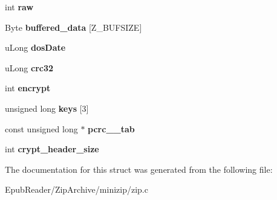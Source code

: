 \begin{DoxyCompactItemize}
\item 
\hypertarget{structcurfile__info_ab79a678fff8d4fb6e55f410d33a5d555}{int {\bfseries raw}}\label{structcurfile__info_ab79a678fff8d4fb6e55f410d33a5d555}

\item 
\hypertarget{structcurfile__info_a73ba705398941ee5d8f0cfc61df6b82d}{Byte {\bfseries buffered\-\_\-data} \mbox{[}Z\-\_\-\-B\-U\-F\-S\-I\-Z\-E\mbox{]}}\label{structcurfile__info_a73ba705398941ee5d8f0cfc61df6b82d}

\item 
\hypertarget{structcurfile__info_afb63cc461b5237c76e41904ed9fb726a}{u\-Long {\bfseries dos\-Date}}\label{structcurfile__info_afb63cc461b5237c76e41904ed9fb726a}

\item 
\hypertarget{structcurfile__info_ab58f6860a40fdaf0932d659d8743f876}{u\-Long {\bfseries crc32}}\label{structcurfile__info_ab58f6860a40fdaf0932d659d8743f876}

\item 
\hypertarget{structcurfile__info_a5bc94d3a94e6ffe7f4e4783c668a263e}{int {\bfseries encrypt}}\label{structcurfile__info_a5bc94d3a94e6ffe7f4e4783c668a263e}

\item 
\hypertarget{structcurfile__info_ac6836b3fb49829e3490cae1e8e319ed6}{unsigned long {\bfseries keys} \mbox{[}3\mbox{]}}\label{structcurfile__info_ac6836b3fb49829e3490cae1e8e319ed6}

\item 
\hypertarget{structcurfile__info_a9de6dd632a0a1eaad2729ae1f993fa71}{const unsigned long $\ast$ {\bfseries pcrc\-\_\-\_\-tab}}\label{structcurfile__info_a9de6dd632a0a1eaad2729ae1f993fa71}

\item 
\hypertarget{structcurfile__info_aec9ef70b3fa0459612a2c2b5c8c2c4ea}{int {\bfseries crypt\-\_\-header\-\_\-size}}\label{structcurfile__info_aec9ef70b3fa0459612a2c2b5c8c2c4ea}

\end{DoxyCompactItemize}


The documentation for this struct was generated from the following file\-:\begin{DoxyCompactItemize}
\item 
Epub\-Reader/\-Zip\-Archive/minizip/zip.\-c\end{DoxyCompactItemize}
